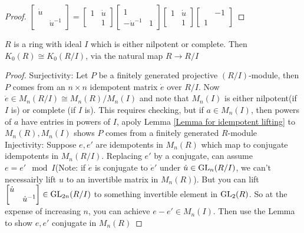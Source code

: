 \documentclass[main]{subfiles}
\begin{document}
\begin{proof}
$
\begin{bmatrix}
\dot u\\
&\dot u^{-1}
\end{bmatrix}=\begin{bmatrix}
1&\dot u\\
&1
\end{bmatrix}\begin{bmatrix}
1\\
-\dot u^{-1}&1
\end{bmatrix}\begin{bmatrix}
1&\dot u\\
&1
\end{bmatrix}\begin{bmatrix}
&-1\\
1
\end{bmatrix}
$
\end{proof}

\begin{theorem}
$R$ is a ring with ideal $I$ which is either nilpotent or complete. Then $K_0(R)\cong K_0(R/I)$, via the natural map $R\to R/I$
\end{theorem}

\begin{proof}
Surjectivity: Let $P$ be a finitely generated projective $(R/I)$-module, then $P$ comes from an $n\times n$ idempotent matrix $\dot e$ over $R/I$. Now $\dot e\in M_n(R/I)\cong M_n(R)/M_n(I)$ and note that $M_n(I)$ is either nilpotent(if $I$ is) or complete (if $I$ is). This requires checking, but if $a\in M_n(I)$, then powers of $a$ have entries in powers of $I$, apoly Lemma \ref{Lemma for idempotent lifting} to $M_n(R),M_n(I)$ shows $P$ comes from a finitely generated $R$-module\\
Injectivity: Suppose $e,e'$ are idempotents in $M_n(R)$ which map to conjugate idempotents in $M_n(R/I)$. Replacing $e'$ by a conjugate, can assume $e=e'\mod I$(Note: if $\dot e$ is conjugate to $\dot e'$ under $\dot u\in \operatorname{GL}_n(R/I)$, we can't necessairly lift $u$ to an invertible matrix in $M_n(R)$). But you can lift $\begin{bmatrix}\dot u\\
&\dot u^{-1}\end{bmatrix}\in\operatorname{GL}_{2n}(R/I)$ to something invertible element in $\operatorname{GL}_2(R)$. So at the expense of increasing $n$, you can achieve $e-e'\in M_n(I)$. Then use the Lemma to show $e,e'$ conjugate in $M_n(R)$
\end{proof}
\end{document}
